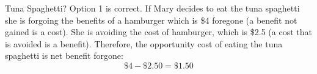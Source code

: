 \documentclass{beamer}
\begin{document}
\beamerdefaultoverlayspecification{<+->}
\begin{frame}{Tuna Spaghetti?}
    Option 1 is correct. If Mary decides to eat the tuna spaghetti she is forgoing the benefits of a hamburger which is \$4 foregone (a benefit not gained is a cost). She is avoiding the cost of hamburger, which is \$2.5  (a cost that is avoided is a benefit). Therefore, the opportunity cost of eating the tuna spaghetti is net benefit forgone: \[\$4 - \$2.50 = \$1.50\]
\end{frame}



\end{document}
